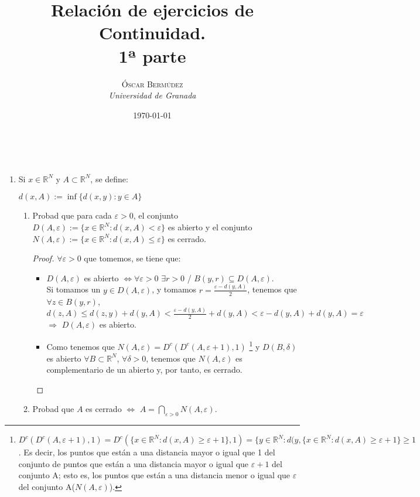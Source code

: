 \documentclass[a4paper, 11pt]{article} %
\title{\textbf{Relación de ejercicios de Continuidad.}\\ %
1ª parte} %
\author{\textsc{Óscar Bermúdez} %
\\{\textit{Universidad de Granada}}} %
\date{\today} %
\makeatletter
\renewcommand{\maketitle}{ %
\begin{flushright} %
{\LARGE\@title} %

\vspace{50pt} %

{\large\@author} %
\\\@date %

\vspace{40pt} %
\end{flushright}
}
\makeatother
\begin{document}
\maketitle %

\pagebreak

\begin{enumerate}
	\item Si $x \in \mathbb{R}^N$ y $A \subset \mathbb{R}^N$, se define:
	\begin{center}
		$d(x,A):=\inf\{d(x,y): y\in A \}$
	\end{center}
	\begin{enumerate}[label=\alph*)]
		\item Probad que para cada $\varepsilon > 0$, el conjunto $D(A,\varepsilon):=\{x \in \mathbb{R}^N: d(x,A) < \varepsilon\}$ es abierto y el conjunto $N(A, \varepsilon):=\{x \in \mathbb{R}^N: d(x,A) \le \varepsilon\}$ es cerrado.
		\begin{proof} 
			$\forall \varepsilon>0$ que tomemos, se tiene que:\\
			\begin{itemize}
			\item $D(A,\varepsilon)$ es abierto $\Leftrightarrow \forall \varepsilon > 0$ $\exists r > 0$  /  $B(y,r) \subseteq D(A,\varepsilon)$.\\
			Si tomamos un $y \in D(A,\varepsilon)$, y tomamos $r=\frac{\varepsilon-d(y,A)}{2}$, tenemos que $\forall z \in B(y,r)$, $d(z,A) \le d(z,y) + d(y,A) < \frac{\varepsilon-d(y,A)}{2}+ d(y,A) < \varepsilon-d(y,A)+d(y,A)=\varepsilon$ $\Rightarrow$ $D(A,\varepsilon)$ es abierto.
			\item Como tenemos que $N(A,\varepsilon) = D^c(D^c(A,\varepsilon+1),1)$ \footnote{$D^c(D^c(A,\varepsilon+1),1) = D^c(\{x\in \mathbb{R}^N: d(x,A)\geq \varepsilon+1 \},1) = \{y\in \mathbb{R}^N: d(y, \{x\in \mathbb{R}^N: d(x,A) \geq \varepsilon+1 \} \geq 1$. Es decir, los puntos que están a una distancia mayor o igual que 1 del conjunto de puntos que están a una distancia mayor o igual que $\varepsilon+1$ del conjunto A; esto es, los puntos que están a una distancia menor o igual que $\varepsilon$ del conjunto A($N(A,\varepsilon)$).} y $D(B,\delta)$ es abierto $\forall B \subset \mathbb{R}^N$, $\forall \delta>0$, tenemos que $N(A,\varepsilon)$ es complementario de un abierto y, por tanto, es cerrado.
			\end{itemize}
		\end{proof}
		\item Probad que $A$ es cerrado $\Leftrightarrow$ $\displaystyle{A =  \bigcap_{\varepsilon>0} N(A, \varepsilon)}$.

\end{enumerate}
\end{enumerate}
\end{document}
